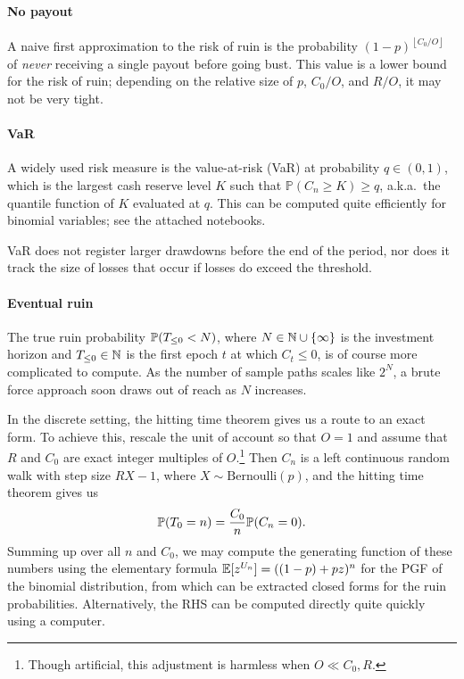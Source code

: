 \paragraph{No payout} A naive first approximation to the risk of ruin is the probability $(1-p)^{\left\lfloor C_0/O \right\rfloor}$ of \emph{never} receiving a single payout before going bust.
  This value is a lower bound for the risk of ruin; depending on the relative size of $p$, $C_0/O$, and $R/O$, it may not be very tight.

\paragraph{VaR} A widely used risk measure is the value-at-risk (VaR) at probability $q\in(0,1)$, which is the largest cash reserve level $K$ such that $\mathbb{P}(C_n\geq K)\geq q$, a.k.a.~the quantile function of $K$ evaluated at $q$.
  This can be computed quite efficiently for binomial variables; see the attached notebooks.
  
  VaR does not register larger drawdowns before the end of the period, nor does it track the size of losses that occur if losses do exceed the threshold.
  
\paragraph{Eventual ruin}
    The true ruin probability $\mathbb{P}(T_{\leq 0}<N)$, where $N\in\mathbb{N}\cup\{\infty\}$ is the investment horizon and $T_{\leq 0}\in\mathbb{N}$ is the first epoch $t$ at which $C_t\leq 0$, is of course more complicated to compute.
    As the number of sample paths scales like $2^N$, a brute force approach soon draws out of reach as $N$ increases.

    In the discrete setting, the hitting time theorem gives us a route to an exact form.
    To achieve this, rescale the unit of account so that $O=1$ and assume that $R$ and $C_0$ are exact integer multiples of $O$.\footnote{Though artificial, this adjustment is harmless when $O\ll C_0,R$.}
    Then $C_n$ is a left continuous random walk with step size $RX - 1$, where $X\sim\mathrm{Bernoulli}(p)$, and the hitting time theorem gives us
    \[
      \mathbb{P}(T_0 = n) = \frac{C_0}{n}\mathbb{P}(C_n = 0).
    \]
    Summing up over all $n$ and $C_0$, we may compute the generating function of these numbers using the elementary formula $\mathbb{E}[z^{U_n}] = ((1-p) + pz)^n$ for the PGF of the binomial distribution, from which can be extracted closed forms for the ruin probabilities.
    Alternatively, the RHS can be computed directly quite quickly using a computer.    

